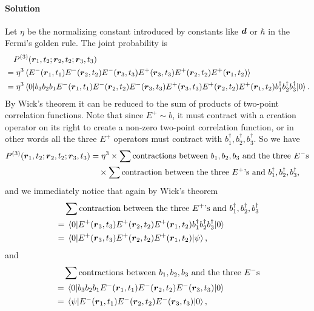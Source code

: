 \documentclass[hyperref, a4paper]{article}
\begin{document}
\paragraph{Solution} Let $\eta$ be the normalizing constant introduced by constants like $\vb*{d}$ or $\hbar$ in the Fermi's golden rule.
The joint probability is 
\[
    \begin{aligned}
        &\quad P^{(3)}(\vb*{r}_1, t_2; \vb*{r}_2, t_2; \vb*{r}_3, t_3) \\ 
        &= \eta^3 \expval*{E^-(\vb*{r}_1, t_1) E^-(\vb*{r}_2, t_2) E^-(\vb*{r}_3, t_3) E^+(\vb*{r}_3, t_3) E^+(\vb*{r}_2, t_2) E^+(\vb*{r}_1, t_2)} \\
        &= \eta^3 \expval*{b_3 b_2 b_1 E^-(\vb*{r}_1, t_1) E^-(\vb*{r}_2, t_2) E^-(\vb*{r}_3, t_3) E^+(\vb*{r}_3, t_3) E^+(\vb*{r}_2, t_2) E^+(\vb*{r}_1, t_2) b_1^\dagger b_2^\dagger b_3^\dagger}{0}.
    \end{aligned}
\]
By Wick's theorem it can be reduced to the sum of products of two-point correlation functions.
Note that since $E^+ \sim b$, it must contract with a creation operator on its right to create a non-zero two-point correlation function, or in other words all the three $E^+$ operators must contract with $b_1^\dagger, b_2^\dagger, b_3^\dagger$.
So we have 
\[
    \begin{aligned}
        P^{(3)}(\vb*{r}_1, t_2; \vb*{r}_2, t_2; \vb*{r}_3, t_3) &= \eta^3 \times \sum \text{contractions between $b_1, b_2, b_3$ and the three $E^-$s} \\
        &\quad \times \sum \text{contraction between the three $E^+$'s and $b_1^\dagger, b_2^\dagger, b_3^\dagger$},
    \end{aligned}
\]
and we immediately notice that again by Wick's theorem 
\[
    \begin{aligned}
        &\quad \sum \text{contraction between the three $E^+$'s and $b_1^\dagger, b_2^\dagger, b_3^\dagger$} \\
        &= \mel{0}{E^+(\vb*{r}_3, t_3) E^+(\vb*{r}_2, t_2) E^+(\vb*{r}_1, t_2) b_1^\dagger b_2^\dagger b_3^\dagger}{0} \\
        &= \mel{0}{E^+(\vb*{r}_3, t_3) E^+(\vb*{r}_2, t_2) E^+(\vb*{r}_1, t_2)}{\psi},
    \end{aligned}
\]
and 
\[
    \begin{aligned}
        &\quad \sum \text{contractions between $b_1, b_2, b_3$ and the three $E^-$s} \\
        &= \mel{0}{b_3 b_2 b_1 E^-(\vb*{r}_1, t_1) E^-(\vb*{r}_2, t_2) E^-(\vb*{r}_3, t_3)}{0} \\
        &= \mel{\psi}{E^-(\vb*{r}_1, t_1) E^-(\vb*{r}_2, t_2) E^-(\vb*{r}_3, t_3)}{0},
    \end{aligned}
\]
\end{document}
